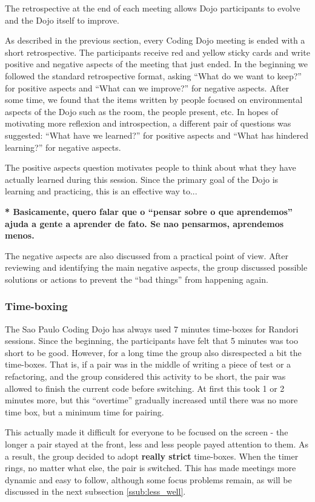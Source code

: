 The retrospective at the end of each meeting allows Dojo participants
to evolve and the Dojo itself to improve.

As described in the previous section, every Coding Dojo meeting is
ended with a short retrospective. The participants receive red and
yellow sticky cards and write positive and negative aspects of the
meeting that just ended. In the beginning we followed the standard
retrospective format, asking ``What do we want to keep?''  for
positive aspects and ``What can we improve?'' for negative
aspects. After some time, we found that the items written by people
focused on environmental aspects of the Dojo such as the room, the
people present, etc. In hopes of motivating more reflexion and
introspection, a different pair of questions was suggested: ``What
have we learned?'' for positive aspects and ``What has hindered
learning?'' for negative aspects.

The positive aspects question motivates people to think about what
they have actually learned during this session. Since the primary goal
of the Dojo is learning and practicing, this is an effective way to...

{\bf** Basicamente, quero falar que o ``pensar sobre o que aprendemos''
ajuda a gente a aprender de fato. Se nao pensarmos, aprendemos menos.}

The negative aspects are also discussed from a practical point of
view. After reviewing and identifying the main negative aspects, the
group discussed possible solutions or actions to prevent the ``bad
things'' from happening again.

\subsubsection{Time-boxing}

The Sao Paulo Coding Dojo has always used 7 minutes time-boxes for
Randori sessions. Since the beginning, the participants have felt
that 5 minutes was too short to be good. However, for a long time the
group also disrespected a bit the time-boxes. That is, if a pair was
in the middle of writing a piece of test or a refactoring, and the
group considered this activity to be short, the pair was allowed to
finish the current code before switching. At first this took 1 or 2
minutes more, but this ``overtime'' gradually increased until there
was no more time box, but a minimum time for pairing.

This actually made it difficult for everyone to be focused on the
screen - the longer a pair stayed at the front, less and less people
payed attention to them. As a result, the group decided to adopt
\textbf{really strict} time-boxes. When the timer rings, no matter
what else, the pair is switched. This has made meetings more dynamic
and easy to follow, although some focus problems remain, as will be
discussed in the next subsection \ref{ssub:less_well}.

